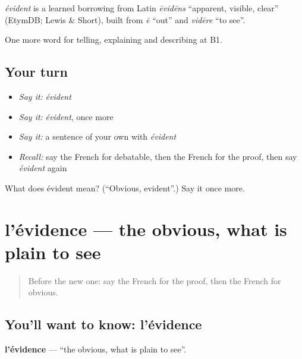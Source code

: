 \begin{cousinweb}
\emph{évident} is a learned borrowing from Latin \emph{ēvidēns} \textquotedblleft{}apparent, visible, clear\textquotedblright{} (EtymDB; Lewis \& Short), built from \emph{ē} \textquotedblleft{}out\textquotedblright{} and \emph{vidēre} \textquotedblleft{}to see\textquotedblright{}.
\end{cousinweb}

\begin{grammarlens}[title={What you've built}]
One more word for telling, explaining and describing at B1.
\end{grammarlens}

\subsection*{Your turn}
\begin{itemize}
\raggedright
  \item \emph{Say it:} \emph{évident}
  \item \emph{Say it:} \emph{évident}, once more
  \item \emph{Say it:} a sentence of your own with \emph{évident}
  \item \emph{Recall:} say the French for debatable, then the French for the proof, then say \emph{évident} again
\end{itemize}

\begin{tcolorbox}[breakable,colback=teal!4,colframe=teal!35!black,title={Before you move on}]
What does évident mean? (\textquotedblleft{}Obvious, evident\textquotedblright{}.) Say it once more.
\end{tcolorbox}
\section[l'évidence]{l'évidence — the obvious, what is plain to see}

\label{lesson:FR-C339-evidence}



\begin{quote}
Before the new one: say the French for the proof, then the French for obvious.
\end{quote}

\subsection*{You'll want to know: l'évidence}
\textbf{l'évidence} — \textquotedblleft{}the obvious, what is plain to see\textquotedblright{}.

